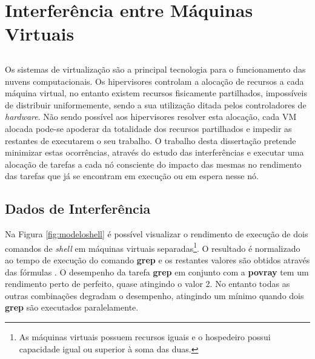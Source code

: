 \chapter{Interferência entre Máquinas Virtuais}\label{chap:interferencia}

\section*{}




Os sistemas de virtualização são a principal tecnologia para o funcionamento das nuvens computacionais. Os hipervisores controlam a alocação de recursos a cada máquina virtual, no entanto existem recursos fisicamente partilhados, impossíveis de distribuir uniformemente, sendo a sua utilização ditada pelos controladores de \textit{hardware}. Não sendo possível aos hipervisores resolver esta alocação, cada VM alocada pode-se apoderar da totalidade dos recursos partilhados e impedir as restantes de executarem o seu trabalho. O trabalho desta dissertação pretende minimizar estas ocorrências, através do estudo das interferências e executar uma alocação de tarefas a cada nó consciente do impacto das mesmas no rendimento das tarefas que já se encontram em execução ou em espera nesse nó.

\section{Dados de Interferência}

Na Figura \ref{fig:modeloshell} é possível visualizar o rendimento de execução de dois comandos de \textit{shell} em máquinas virtuais separadas\footnote{As máquinas virtuais possuem recursos iguais e o hospedeiro possui capacidade igual ou superior à soma das duas.}. O resultado é normalizado ao tempo de execução do comando \textbf{grep} e os restantes valores são obtidos através das fórmulas . O desempenho da tarefa \textbf{grep} em conjunto com a \textbf{povray} tem um rendimento perto de perfeito, quase atingindo o valor 2. No entanto todas as outras combinações degradam o desempenho, atingindo um mínimo quando dois \textbf{grep} são executados paralelamente. 

